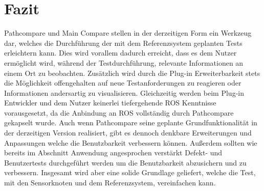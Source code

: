 \chapter{Fazit}
\label{sec:conclusion}
Pathcompare und Main Compare stellen in der derzeitigen Form ein Werkzeug dar, welches die
Durchführung der mit dem Referenzsystem geplanten Tests erleichtern kann. Dies wird vorallem
dadurch erreicht, dass es dem Nutzer ermöglicht wird, während der Testdurchführung, relevante
Informationen an einem Ort zu beobachten. Zusätzlich wird durch die Plug-in
Erweiterbarkeit stets die Möglichkeit offengehalten auf neue Testanforderungen
zu reagieren oder Informationen andersartig zu visualisieren. Gleichzeitig
werden beim Plug-in Entwickler und dem Nutzer keinerlei tiefergehende ROS
Kenntnisse vorausgesetzt, da die Anbindung an ROS vollständig durch Pathcompare
gekapselt wurde. Auch wenn Pathcompare seine geplante Grundfunktionalität in der
derzeitigen Version realisiert, gibt es dennoch denkbare Erweiterungen und
Anpassungen welche die Benutzbarkeit verbessern können. 
Außerdem sollten wie bereits im Abschnitt Anwendung angesprochen verstärkt
Defekt- und Benutzertests durchgeführt werden um die Benutzbarkeit abzusichern
und zu verbessern. Insgesamt wird aber eine solide Grundlage geliefert,
welche die Test, mit den Sensorknoten und dem Referenzsystem, vereinfachen kann.

